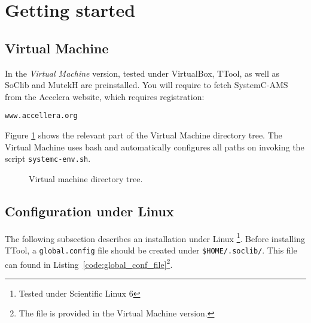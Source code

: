 
\setcounter{section}{0}

\section{Getting started}

\subsection{Virtual Machine}

In the \textit{Virtual Machine} version, tested under VirtualBox, TTool, as well as SoClib and MutekH
are preinstalled.
You will require to fetch SystemC-AMS from the Accelera website, which requires registration:

\texttt{www.accellera.org}

Figure \ref{tree:vm} shows the relevant part of the Virtual Machine directory tree.
The Virtual Machine uses bash and automatically configures all paths on invoking the script \texttt{systemc-env.sh}.

\begin{figure}
  \caption{Virtual machine directory tree.}
  \label{tree:vm}
\end{figure}

\subsection{Configuration under Linux}
The following subsection describes an installation under Linux \footnote{Tested under Scientific Linux 6}. 
Before installing TTool, a \texttt{global.config} file should be created under \texttt{\$HOME/.soclib/}. This file can found in Listing~\ref{code:global_conf_file}\footnote{
The file is provided in the Virtual Machine version.}.

